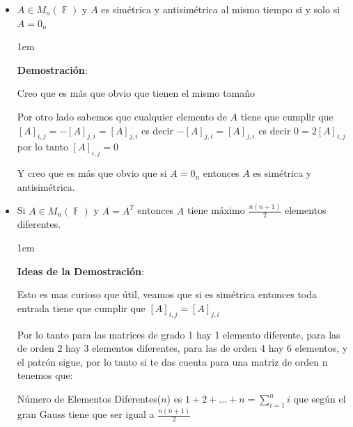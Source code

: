\documentclass[12pt, fleqn]{report}                             %
\newenvironment{SmallIndentation}[1][0.75em]                    %
        {\begin{adjustwidth}{#1}{}\begin{footnotesize}}             %
        {\end{footnotesize}\end{adjustwidth}}                       %
\theoremstyle{break}                                            %
\DeclareMathOperator \GenericField {\mathbb{F}}                 %
\begin{document}
\begin{itemize}
\begin{SmallIndentation}[1em]
                            \end{SmallIndentation}


                        \item $A \in M_{n}(\GenericField)$ y $A$ es simétrica y antisimétrica al mismo tiempo
                            si y solo si $A = 0_n$

                            \begin{SmallIndentation}[1em]
                                \textbf{Demostración}:

                                Creo que es más que obvio que tienen el mismo tamaño

                                Por otro lado sabemos que cualquier elemento de $A$ tiene que cumplir
                                que $[A]_{i,j}=-[A]_{j,i} = [A]_{j,i}$ es decir $-[A]_{j,i} = [A]_{j,i}$
                                es decir $0 = 2[A]_{i,j}$ por lo tanto $[A]_{i,j} = 0$

                                Y creo que es más que obvio que si $A = 0_n$ entonces $A$ es simétrica y
                                antisimétrica.

                            \end{SmallIndentation}

                        \item Si $A \in M_{n}(\GenericField)$ y $A = A^T$ entonces $A$ tiene máximo 
                            $\frac{n(n+1)}{2}$ elementos diferentes.

                            \begin{SmallIndentation}[1em]
                                \textbf{Ideas de la Demostración}:

                                Esto es mas curioso que útil, veamos que si es simétrica entonces toda
                                entrada tiene que cumplir que $[A]_{i, j} = [A]_{j,i}$

                                Por lo tanto para las matrices de grado 1 hay 1 elemento diferente, 
                                para las de orden 2 hay 3 elementos diferentes, para las de orden 4 hay 6
                                elementos, y el patrón sigue, por lo tanto si te das cuenta para 
                                una matriz de orden n tenemos que:

                                Número de Elementos Diferentes($n$) es $1+2+\dots+n = \sum_{i=1}^{n} i$
                                que según el gran Gauss tiene que ser igual a $\frac{n(n+1)}{2}$


\end{SmallIndentation}
\end{itemize}
\end{document}
